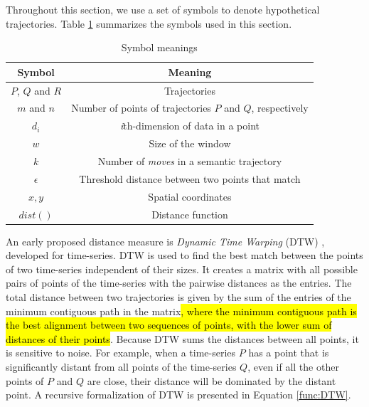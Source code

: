 \documentclass[12pt]{article}
\begin{document}
Throughout this section, we use a set of symbols to denote hypothetical trajectories. Table \ref{tab:symbols} summarizes the symbols used in this section.

\begin{table}[!h]
    \centering
    \begin{tabular}{c|c}
         Symbol & Meaning  \\
         \hline
         $P$, $Q$ and $R$ & Trajectories \\
         $m$ and $n$ & Number of points of trajectories $P$ and $Q$, respectively \\
         $d_i$ & \emph{i}th-dimension of data in a point \\
         $w$ & Size of the window \\
         $k$ & Number of \emph{moves} in a semantic trajectory \\
         $\epsilon$ & Threshold distance between two points that match \\
         $x,y$ & Spatial coordinates \\
         $dist()$ & Distance function
    \end{tabular}
    \caption{Symbol meanings}
    \label{tab:symbols}
\end{table}

An early proposed distance measure is \emph{Dynamic Time Warping} (DTW) \cite{berndt1994using}, developed for time-series. DTW is used to find the best match between the points of two time-series independent of their sizes. It creates a matrix with all possible pairs of points of the time-series with the pairwise distances as the entries. %
The total distance between two trajectories is given by the sum of the entries of the minimum contiguous path in the matrix\hl{, where the minimum contiguous path is the best alignment between two sequences of points, with the lower sum of distances of their points}. Because DTW sums the distances between all points, it is sensitive to noise. For example, when a time-series $P$ has a point that is significantly distant from all points of the time-series $Q$, even if all the other points of $P$ and $Q$ are close, their distance will be dominated by the distant point. A recursive formalization of DTW is presented in Equation \ref{func:DTW}.

\end{document}
